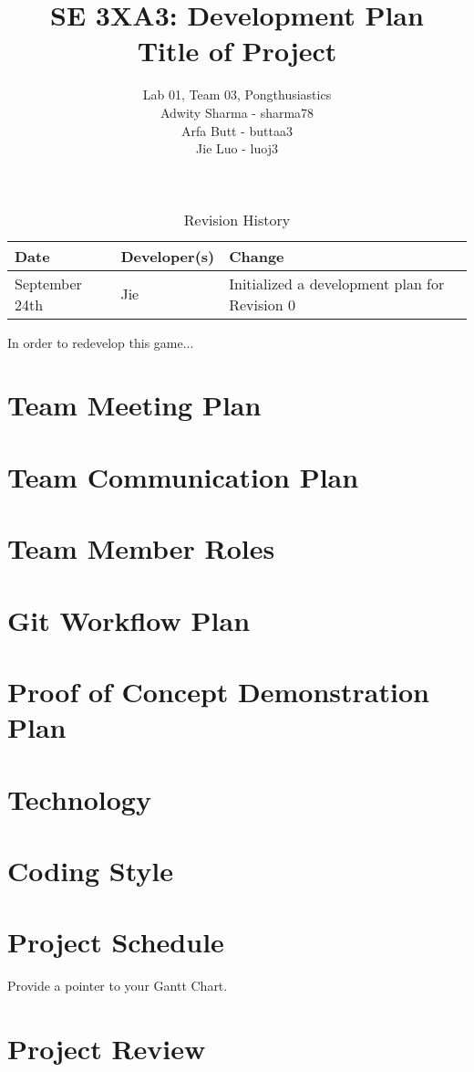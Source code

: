 \documentclass{article}
\title{SE 3XA3: Development Plan\\Title of Project}
\author{Lab 01, Team 03, Pongthusiastics
		\\ Adwity Sharma - sharma78
		\\ Arfa Butt - buttaa3
		\\ Jie Luo - luoj3
}
\date{}
\begin{document}
\begin{table}[hp]
\caption{Revision History} \label{TblRevisionHistory}
\begin{tabularx}{\textwidth}{llX}
\toprule
\textbf{Date} & \textbf{Developer(s)} & \textbf{Change}\\
\midrule
September 24th & Jie & Initialized a development plan for Revision 0\\
\bottomrule
\end{tabularx}
\end{table}

\newpage

\maketitle

In order to redevelop this game...

\section{Team Meeting Plan}

\section{Team Communication Plan}

\section{Team Member Roles}

\section{Git Workflow Plan}

\section{Proof of Concept Demonstration Plan}

\section{Technology}

\section{Coding Style}

\section{Project Schedule}

Provide a pointer to your Gantt Chart.

\section{Project Review}
\end{document}

